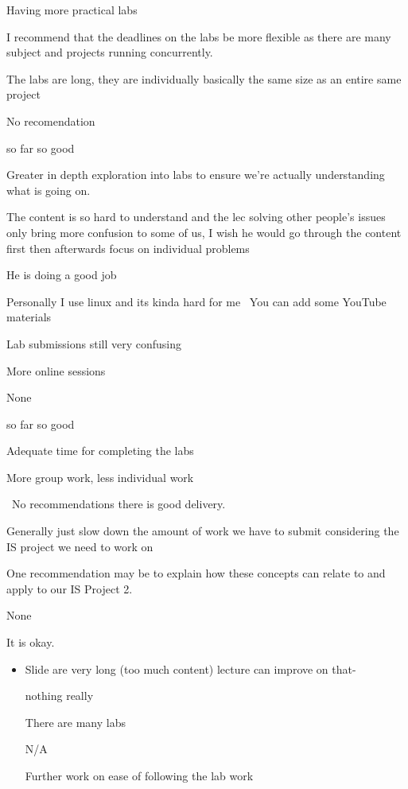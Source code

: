 \documentclass[
]{article}
\providecommand{\tightlist}{%
  \setlength{\itemsep}{0pt}\setlength{\parskip}{0pt}}
\begin{document}
\begin{enumerate}
\begin{itemize}
\begin{itemize}
      Having more practical labs

      I recommend that the deadlines on the labs be more flexible as
      there are many subject and projects running concurrently.

      The labs are long, they are individually basically the same size
      as an entire same project

      No recomendation

      so far so good

      Greater in depth exploration into labs to ensure we're actually
      understanding what is going on.

      The content is so hard to understand and the lec solving other
      people's issues only bring more confusion to some of us, I wish he
      would go through the content first then afterwards focus on
      individual problems

      He is doing a good job

      Personally I use linux and its kinda hard for me~ You can add some
      YouTube materials~

      Lab submissions still very confusing

      More online sessions

      None

      so far so good

      Adequate time for completing the labs

      More group work, less individual work

      ~No recommendations there is good delivery.

      Generally just slow down the amount of work we have to submit
      considering the IS project we need to work on

      One recommendation may be to explain how these concepts can relate
      to and apply to our IS Project 2.

      None

      It is okay.

      \begin{itemize}
      \tightlist
      \item
        Slide are very long (too much content) lecture can improve on
        that-

        nothing really

        There are many labs

        N/A

        Further work on ease of following the lab work


\end{itemize}
\end{itemize}
\end{itemize}
\end{enumerate}
\end{document}
